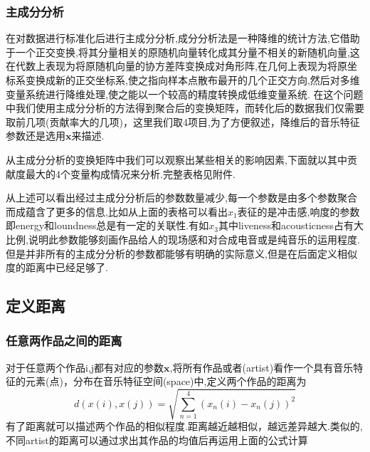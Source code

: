 \documentclass[a4paper,12pt]{article}
\begin{document}
\begin{spacing}{1.2}
	\subsubsection{主成分分析}
	在对数据进行标准化后进行主成分分析,成分分析法是一种降维的统计方法,它借助于一个正交变换,将其分量相关的原随机向量转化成其分量不相关的新随机向量,这在代数上表现为将原随机向量的协方差阵变换成对角形阵,在几何上表现为将原坐标系变换成新的正交坐标系,使之指向样本点散布最开的几个正交方向,然后对多维变量系统进行降维处理,使之能以一个较高的精度转换成低维变量系统.
	在这个问题中我们使用主成分分析的方法得到聚合后的变换矩阵，而转化后的数据我们仅需要取前几项(贡献率大的几项)，这里我们取4项目,为了方便叙述，降维后的音乐特征参数还是选用$\bm{x}$来描述.
	\par
	从主成分分析的变换矩阵中我们可以观察出某些相关的影响因素,下面就以其中贡献度最大的4个变量构成情况来分析.完整表格见附件.
\begin{table}[H]
		\centering
\end{table}
从上述可以看出经过主成分分析后的参数数量减少,每一个参数是由多个参数聚合而成蕴含了更多的信息,比如从上面的表格可以看出$x_{1}$表征的是冲击感,响度的参数即energy和loundness总是有一定的关联性.有如$x_{3}$其中liveness和acousticness占有大比例,说明此参数能够刻画作品给人的现场感和对合成电音或是纯音乐的运用程度.但是并非所有的主成分分析的参数都能够有明确的实际意义,但是在后面定义相似度的距离中已经足够了.
\subsection{定义距离}
\subsubsection{任意两作品之间的距离}
对于任意两个作品i,j都有对应的参数$\bm{x}$,将所有作品或者(artist)看作一个具有音乐特征的元素(点)，分布在音乐特征空间(space)中,定义两个作品的距离为
	$$
	d(x(i),x(j))=\sqrt{\sum\limits_{n=1}^{4}\left( x_{n}(i)- x_{n}(j)\right)^{2}}
	$$
	有了距离就可以描述两个作品的相似程度.距离越近越相似，越远差异越大.类似的,不同artist的距离可以通过求出其作品的均值后再运用上面的公式计算\\

\end{spacing}
\end{document}
